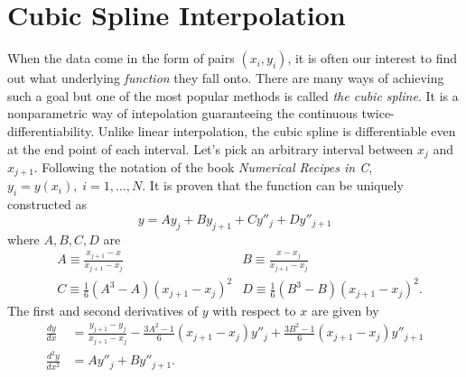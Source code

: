 \documentclass[11pt]{article}
\begin{document}
\section{Cubic Spline Interpolation}
When the data come in the form of pairs $\left(x_{i},y_{i}\right)$, it is often our interest to find out what underlying \emph{function} they fall onto. There are many ways of achieving such a goal but one of the most popular methods is called \emph{the cubic spline}. It is a nonparametric way of intepolation guaranteeing the continuous twice-differentiability. Unlike linear interpolation, the cubic spline is differentiable even at the end point of each interval. Let's pick an arbitrary interval between $x_{j}$ and $x_{j+1}$. Following the notation of the book \emph{Numerical Recipes in C}, $y_{i} = y\left(x_{i}\right),\; i = 1,\ldots , N$. It is proven that the function can be uniquely constructed as
\begin{equation}
  y = Ay_{j} + By_{j+1} + Cy''_{j} + Dy''_{j+1}
\end{equation}
where $A,B,C,D$ are
\begin{align}
  &A \equiv \frac{x_{j+1}-x}{x_{j+1}-x_{j}} &B \equiv \frac{x-x_{j}}{x_{j+1}-x_{j}}\\
  &C \equiv \frac{1}{6}\left(A^{3}-A\right)\left(x_{j+1}-x_{j}\right)^{2} &D \equiv \frac{1}{6}\left(B^{3}-B\right)\left(x_{j+1}-x_{j}\right)^{2}.
\end{align}
The first and second derivatives of $y$ with respect to $x$ are given by
\begin{align}
  \frac{dy}{dx} &= \frac{y_{j+1}-y_{j}}{x_{j+1}-x_{j}} - \frac{3A^{2}-1}{6}\left(x_{j+1}-x_{j}\right)y''_{j}+\frac{3B^{2}-1}{6}\left(x_{j+1}-x_{j}\right)y''_{j+1}\\
  \frac{d^{2}y}{dx^{2}} &= Ay''_{j} + By''_{j+1}.
 \end{align}
\end{document}

